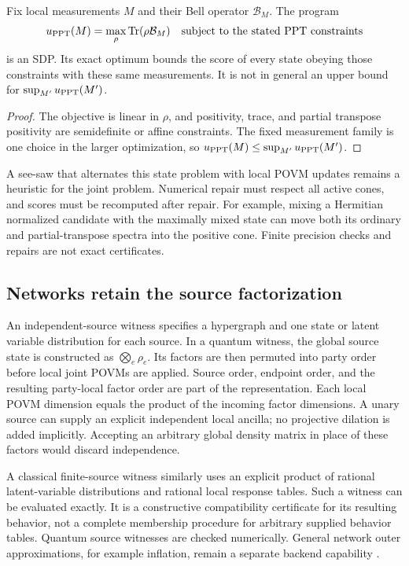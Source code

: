 \begin{proposition}
Fix local measurements $M$ and their Bell operator $\mathcal B_M$. The program
\[
 u_{\rm PPT}(M)=\max_\rho\operatorname{Tr}(\rho\mathcal B_M)
 \quad\text{subject to the stated PPT constraints}
\]
is an SDP. Its exact optimum bounds the score of every state obeying those
constraints with these same measurements. It is not in general an upper bound for
$\sup_{M'}u_{\rm PPT}(M')$.
\end{proposition}
\begin{proof}
The objective is linear in $\rho$, and positivity, trace, and partial
transpose positivity are semidefinite or affine constraints. The fixed
measurement family is one choice in the larger optimization, so
$u_{\rm PPT}(M)\leq\sup_{M'}u_{\rm PPT}(M')$.
\end{proof}
A see-saw that alternates this state problem with local POVM updates remains
a heuristic for the joint problem. Numerical repair must respect all active
cones, and scores must be recomputed after repair. For example, mixing a
Hermitian normalized candidate with the maximally mixed state can move both
its ordinary and partial-transpose spectra into the positive cone. Finite
precision checks and repairs are not exact certificates.

\subsection{Networks retain the source factorization}
An independent-source witness specifies a hypergraph and one state or latent
variable distribution for each source. In a quantum witness, the global
source state is constructed as $\bigotimes_e\rho_e$. Its factors are then
permuted into party order before local joint POVMs are applied. Source order,
endpoint order, and the resulting party-local factor order are part of the
representation. Each local POVM dimension equals the product of the incoming
factor dimensions. A unary source can supply an explicit independent local
ancilla; no projective dilation is added implicitly. Accepting an arbitrary
global density matrix in place of these factors would discard independence.

A classical finite-source witness similarly uses an explicit product of
rational latent-variable distributions and rational local response tables.
Such a witness can be evaluated exactly. It is a constructive compatibility
certificate for its resulting behavior, not a complete membership procedure
for arbitrary supplied behavior tables. Quantum source witnesses are checked
numerically. General network outer approximations, for example inflation,
remain a separate backend capability \cite{wolfe2021}.

